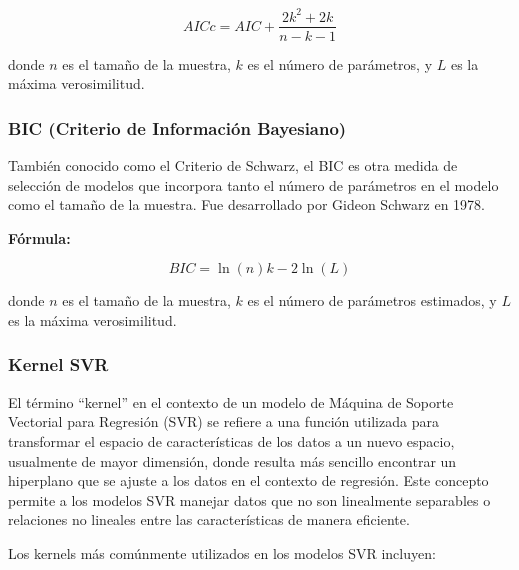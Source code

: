 \documentclass[
  11pt,
  bookmarksnumbered]{article}
\begin{document}

\begin{equation}
AICc = AIC + \frac{2k^2 + 2k}{n - k - 1}\end{equation}

donde \(n\) es el tamaño de la muestra, \(k\) es el número de parámetros, y \(L\) es la máxima verosimilitud.

\hypertarget{bic-criterio-de-informaciuxf3n-bayesiano}{%
\subsubsection{BIC (Criterio de Información Bayesiano)}\label{bic-criterio-de-informaciuxf3n-bayesiano}}

También conocido como el Criterio de Schwarz, el BIC es otra medida de selección de modelos que incorpora tanto el número de parámetros en el modelo como el tamaño de la muestra.
Fue desarrollado por Gideon Schwarz en 1978.

\textbf{Fórmula:}


\begin{equation} BIC = \ln(n)k - 2\ln(L) \end{equation}

donde \(n\) es el tamaño de la muestra, \(k\) es el número de parámetros estimados, y \(L\) es la máxima verosimilitud.

\hypertarget{kernel-svr}{%
\subsubsection{Kernel SVR}\label{kernel-svr}}

El término ``kernel'' en el contexto de un modelo de Máquina de Soporte Vectorial para Regresión (SVR) se refiere a una función utilizada para transformar el espacio de características de los datos a un nuevo espacio, usualmente de mayor dimensión, donde resulta más sencillo encontrar un hiperplano que se ajuste a los datos en el contexto de regresión.
Este concepto permite a los modelos SVR manejar datos que no son linealmente separables o relaciones no lineales entre las características de manera eficiente.

Los kernels más comúnmente utilizados en los modelos SVR incluyen:
\end{document}
